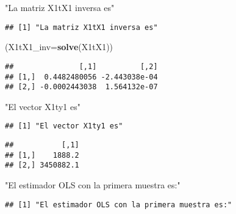 \documentclass[
]{article}
\newenvironment{Shaded}{\begin{snugshade}}{\end{snugshade}}
\newcommand{\DataTypeTok}[1]{\textcolor[rgb]{0.13,0.29,0.53}{#1}}
\newcommand{\KeywordTok}[1]{\textcolor[rgb]{0.13,0.29,0.53}{\textbf{#1}}}
\newcommand{\NormalTok}[1]{#1}
\newcommand{\OperatorTok}[1]{\textcolor[rgb]{0.81,0.36,0.00}{\textbf{#1}}}
\newcommand{\StringTok}[1]{\textcolor[rgb]{0.31,0.60,0.02}{#1}}
\begin{document}
\begin{Shaded}
\begin{Highlighting}[]
\StringTok{"La matriz X1tX1 inversa es"}
\end{Highlighting}
\end{Shaded}

\begin{verbatim}
## [1] "La matriz X1tX1 inversa es"
\end{verbatim}

\begin{Shaded}
\begin{Highlighting}[]
\NormalTok{(}\DataTypeTok{X1tX1_inv=}\KeywordTok{solve}\NormalTok{(X1tX1))}
\end{Highlighting}
\end{Shaded}

\begin{verbatim}
##               [,1]          [,2]
## [1,]  0.4482480056 -2.443038e-04
## [2,] -0.0002443038  1.564132e-07
\end{verbatim}

\begin{Shaded}
\begin{Highlighting}[]
\StringTok{"El vector X1ty1 es"}
\end{Highlighting}
\end{Shaded}

\begin{verbatim}
## [1] "El vector X1ty1 es"
\end{verbatim}

\begin{Shaded}
\end{Shaded}

\begin{verbatim}
##           [,1]
## [1,]    1888.2
## [2,] 3450882.1
\end{verbatim}

\begin{Shaded}
\begin{Highlighting}[]
\StringTok{"El estimador OLS con la primera muestra es:"}
\end{Highlighting}
\end{Shaded}

\begin{verbatim}
## [1] "El estimador OLS con la primera muestra es:"
\end{verbatim}
\end{document}
